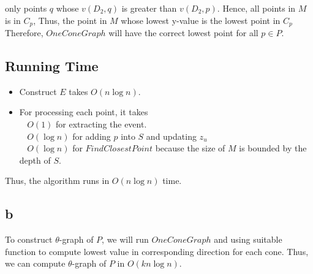 \documentclass[12pt]{article}
\begin{document}
only points $q$ whose $v(D_2,q)$ is greater than $v(D_2,p)$. Hence, all points in $M$ is in $C_p$,
Thus, the point in $M$ whose lowest y-value is the lowest point in $C_p$ \\

\newpage
Therefore, $OneConeGraph$ will have the correct lowest point for all $p \in P$.

\subsection*{Running Time}
\begin{itemize}
    \item Construct $E$ takes $O(n\log{n})$.
    \item For processing each point, it takes \\
    $\;\;$ $O(1)$ for extracting the event.\\
    $\;\;$ $O(\log{n})$ for adding $p$ into $S$ and updating $z_u$\\
    $\;\;$ $O(\log{n})$ for $FindClosestPoint$ because the size of $M$ is bounded by the depth of $S$.
\end{itemize}

Thus, the algorithm runs in $O(n\log{n})$ time.

\subsection*{b}
To construct $\theta$-graph of $P$, we will run $OneConeGraph$ and using suitable function to compute lowest value in corresponding
direction for each cone. Thus, we can compute $\theta$-graph of $P$ in $O(kn\log{n})$.
\end{document}
